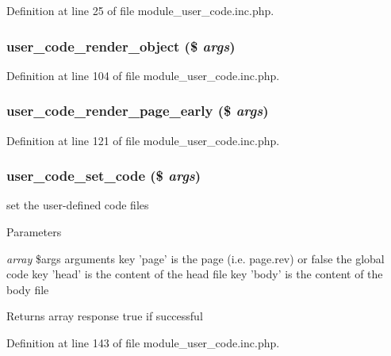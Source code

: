Definition at line 25 of file module\_\-user\_\-code.inc.php.

\hypertarget{module__user__code_8inc_8php_ae2a601394f96c69bb105d73774d2aa29}{
\subsubsection[{user\_\-code\_\-render\_\-object}]{\setlength{\rightskip}{0pt plus 5cm}user\_\-code\_\-render\_\-object (\$ {\em args})}}
\label{module__user__code_8inc_8php_ae2a601394f96c69bb105d73774d2aa29}


Definition at line 104 of file module\_\-user\_\-code.inc.php.

\hypertarget{module__user__code_8inc_8php_ac616caa2e8476e976c51e8b833e6d55b}{
\subsubsection[{user\_\-code\_\-render\_\-page\_\-early}]{\setlength{\rightskip}{0pt plus 5cm}user\_\-code\_\-render\_\-page\_\-early (\$ {\em args})}}
\label{module__user__code_8inc_8php_ac616caa2e8476e976c51e8b833e6d55b}


Definition at line 121 of file module\_\-user\_\-code.inc.php.

\hypertarget{module__user__code_8inc_8php_a788372f1e959532d09dceb63209507cb}{
\subsubsection[{user\_\-code\_\-set\_\-code}]{\setlength{\rightskip}{0pt plus 5cm}user\_\-code\_\-set\_\-code (\$ {\em args})}}
\label{module__user__code_8inc_8php_a788372f1e959532d09dceb63209507cb}
set the user-\/defined code files


\begin{DoxyParams}{Parameters}
\item[{\em array}]\$args arguments key 'page' is the page (i.e. page.rev) or false the global code key 'head' is the content of the head file key 'body' is the content of the body file \end{DoxyParams}
\begin{DoxyReturn}{Returns}
array response true if successful 
\end{DoxyReturn}


Definition at line 143 of file module\_\-user\_\-code.inc.php.

